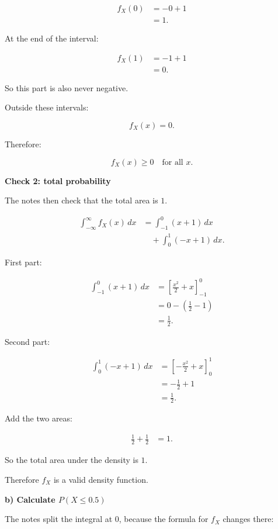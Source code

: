 \documentclass[10pt]{article}
\begin{document}
\begin{align*}
f_X(0)
&=-0+1 \\[2mm]
&=1.
\end{align*}

At the end of the interval:

\begin{align*}
f_X(1)
&=-1+1 \\[2mm]
&=0.
\end{align*}

So this part is also never negative.

Outside these intervals:

\[
f_X(x)=0.
\]

Therefore:

\[
f_X(x)\ge 0
\quad \text{for all }x.
\]

\textbf{Check 2: total probability}

The notes then check that the total area is \(1\).

\begin{align*}
\int_{-\infty}^{\infty} f_X(x)\,dx
&=
\int_{-1}^{0}(x+1)\,dx \\
&\quad+
\int_{0}^{1}(-x+1)\,dx.
\end{align*}

First part:

\begin{align*}
\int_{-1}^{0}(x+1)\,dx
&=
\left[
\frac{x^2}{2}+x
\right]_{-1}^{0} \\[2mm]
&=0-
\left(
\frac{1}{2}-1
\right) \\[2mm]
&=\frac{1}{2}.
\end{align*}

Second part:

\begin{align*}
\int_{0}^{1}(-x+1)\,dx
&=
\left[
-\frac{x^2}{2}+x
\right]_{0}^{1} \\[2mm]
&=
-\frac{1}{2}+1 \\[2mm]
&=\frac{1}{2}.
\end{align*}

Add the two areas:

\begin{align*}
\frac{1}{2}+\frac{1}{2}
&=1.
\end{align*}

So the total area under the density is \(1\).

Therefore \(f_X\) is a valid density function.

\textbf{b) Calculate \(P(X\le 0.5)\)}

The notes split the integral at \(0\), because the
formula for \(f_X\) changes there:
\end{document}
